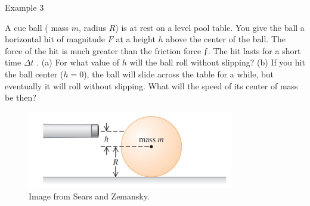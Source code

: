 \documentclass[]{beamer}
\begin{document}

\begin{frame}

Example 3
  \vspace{7mm}



  A cue ball ( mass $m$, radius $R$) is at
  rest on a level pool table. You give the ball a
 horizontal hit of magnitude $F$ at a height $h$ above the center
  of the ball. The force of the hit is much greater
  than the friction force $ƒ$.
  The hit lasts for a short time $\Delta t$ . (a) For what value of
  $h$ will the ball roll without slipping? (b) If you hit the ball 
  center ($h=0$), the ball will slide across the table for a while, but
  eventually it will roll without slipping. What will the speed of its
  center of mass be then?
  
  \begin{figure}[h!]  
    \includegraphics[width=0.8\textwidth]{images/15.jpg}
    \caption{Image from Sears and Zemansky.}
  \end{figure}


  \end{frame}











 
\end{document}
